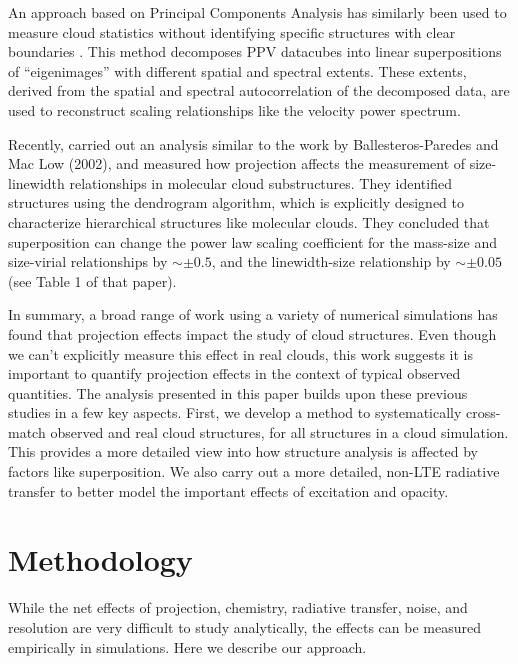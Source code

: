An approach based on Principal Components Analysis has similarly been used to measure cloud statistics without identifying specific structures with clear boundaries \citep{http://adsabs.harvard.edu/abs/1997ApJ...475..173H, http://adsabs.harvard.edu/abs/2002ApJ...566..276B, http://adsabs.harvard.edu/abs/2013MNRAS.433..117B}. This method decomposes PPV datacubes into linear superpositions of ``eigenimages'' with different spatial and spectral extents. These extents, derived from the spatial and spectral autocorrelation of the decomposed data, are used to reconstruct scaling relationships like the velocity power spectrum.

Recently, \cite{http://adsabs.harvard.edu/abs/2010ApJ...712.1049S} carried out an analysis similar to the work by Ballesteros-Paredes and Mac Low (2002), and measured how projection affects the measurement of size-linewidth relationships in molecular cloud substructures. They identified structures using the dendrogram algorithm, which is explicitly designed to characterize hierarchical structures like molecular clouds. They concluded that superposition can change the power law scaling coefficient for the mass-size and size-virial relationships by $\sim \pm 0.5$, and the linewidth-size relationship by $\sim \pm 0.05$ (see Table 1 of that paper).

In summary, a broad range of work using a variety of numerical simulations has found that projection effects impact the study of cloud structures. Even though we can't explicitly measure this effect in real clouds, this work suggests it is important to quantify projection effects in the context of typical observed quantities. The analysis presented in this paper builds upon these previous studies in a few key aspects. First, we develop a method to systematically cross-match observed and real cloud structures,
for all structures in a cloud simulation. This provides a more detailed view into how structure analysis is affected by factors like superposition. We also carry out a more detailed, non-LTE radiative
transfer to better model the important effects of excitation and opacity.


\section{Methodology}
\label{sec:method_ch5_ppv}
While the net effects of projection, chemistry, radiative transfer, noise, and resolution are very difficult to study analytically, the effects can be measured empirically in simulations.  Here we describe our approach.

